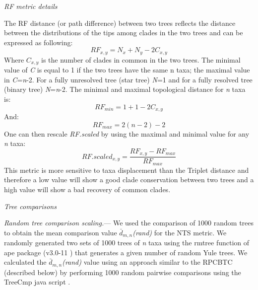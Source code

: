 \documentclass[12pt,letterpaper]{article}
\renewcommand{\subsection}[1]{%
\bigskip
\begin{center}
\begin{large}
\normalfont\itshape #1
\end{large}
\end{center}}
\renewcommand{\subsubsection}[1]{%
\vspace{2ex}
\noindent
\textit{#1.}---}
\begin{document}
\subsection{RF metric details}
The RF distance (or path difference) between two trees reflects the distance between the distributions of the tips among clades in the two trees \citep{RF1981} and can be expressed as following:
\begin{equation}
RF_{x,y} = N_{x} + N_{y} - 2C_{x,y}
\end{equation}
Where $C_{x,y}$ is the number of clades in common in the two trees. 
The minimal value of \textit{C} is equal to 1 if the two trees have the same n taxa;
the maximal value in \textit{C}=\textit{n}-2.
For a fully unresolved tree (star tree) \textit{N}=1 and for a fully resolved tree (binary tree) \textit{N}=\textit{n}-2.
The minimal and maximal topological distance for \textit{n} taxa is:
\begin{equation}
RF_{min} = 1 + 1 - 2C_{x,y}
\end{equation}
And:
\begin{equation}
RF_{max} = 2(n-2)-2
\end{equation}
One can then rescale \textit{RF.scaled} by using the maximal and minimal value for any \textit{n} taxa:
\begin{equation}
RF.scaled_{x,y} = \frac{RF_{x,y}-RF_{max}}{RF_{max}}
\end{equation}
This metric is more sensitive to taxa displacement than the Triplet distance \citep{critchlowthe1996,johnson1998,wiensmissing2003} and therefore a low value will show a good clade conservation between two trees and a high value will show a bad recovery of common clades.

\subsection{Tree comparisons}
\subsubsection{Random tree comparison scaling}
We used the comparison of 1000 random trees to obtain the mean comparison value $\bar{d}_{m,n}$\textit{(rand)} for the NTS metric.
We randomly generated two sets of 1000 trees of \textit{n} taxa using the rmtree function of ape package (v3.0-11 \citet{paradisape:2004}) that generates a given number of random Yule trees.
We calculated the $\bar{d}_{m,n}$\textit{(rand)} value using an approach similar to the RPCBTC (described below) by performing 1000 random pairwise comparisons using the TreeCmp java script \citep{Bogdanowicz2012}.
\end{document}
